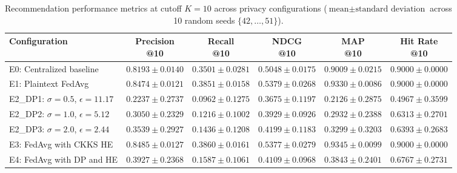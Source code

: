 \clearpage

\begin{table}[H]
\centering
\scriptsize
\setlength{\tabcolsep}{2.5pt}
\renewcommand{\arraystretch}{1.12}
\caption{Recommendation performance metrics at cutoff $K=10$ across privacy configurations ($\text{mean} \pm \text{standard deviation}$ across 10 random seeds $\{42, \dots, 51\}$).}
\label{tab:recommendation_results}
\begin{tabularx}{\textwidth}{>{\raggedright\arraybackslash}X*{5}{c}}
\toprule
\textbf{Configuration} & \shortstack{\textbf{Precision}\\\textbf{@10}} & \shortstack{\textbf{Recall}\\\textbf{@10}} & \shortstack{\textbf{NDCG}\\\textbf{@10}} & \shortstack{\textbf{MAP}\\\textbf{@10}} & \shortstack{\textbf{Hit Rate}\\\textbf{@10}} \\
\midrule
E0: Centralized baseline & $0.8193 \pm 0.0140$ & $0.3501 \pm 0.0281$ & $0.5048 \pm 0.0175$ & $0.9009 \pm 0.0215$ & $0.9000 \pm 0.0000$ \\
E1: Plaintext FedAvg & $0.8474 \pm 0.0121$ & $0.3851 \pm 0.0158$ & $0.5379 \pm 0.0268$ & $0.9330 \pm 0.0086$ & $0.9000 \pm 0.0000$ \\
E2\_DP1: $\sigma=0.5$, $\epsilon=11.17$ & $0.2237 \pm 0.2737$ & $0.0962 \pm 0.1275$ & $0.3675 \pm 0.1197$ & $0.2126 \pm 0.2875$ & $0.4967 \pm 0.3599$ \\
E2\_DP2: $\sigma=1.0$, $\epsilon=5.12$ & $0.3050 \pm 0.2329$ & $0.1216 \pm 0.1002$ & $0.3929 \pm 0.0926$ & $0.2932 \pm 0.2388$ & $0.6313 \pm 0.2701$ \\
E2\_DP3: $\sigma=2.0$, $\epsilon=2.44$ & $0.3539 \pm 0.2927$ & $0.1436 \pm 0.1208$ & $0.4199 \pm 0.1183$ & $0.3299 \pm 0.3203$ & $0.6393 \pm 0.2683$ \\
E3: FedAvg with CKKS HE & $0.8485 \pm 0.0127$ & $0.3860 \pm 0.0161$ & $0.5377 \pm 0.0279$ & $0.9345 \pm 0.0099$ & $0.9000 \pm 0.0000$ \\
E4: FedAvg with DP and HE & $0.3927 \pm 0.2368$ & $0.1587 \pm 0.1061$ & $0.4109 \pm 0.0968$ & $0.3843 \pm 0.2401$ & $0.6767 \pm 0.2731$ \\
\bottomrule
\end{tabularx}

\end{table}
